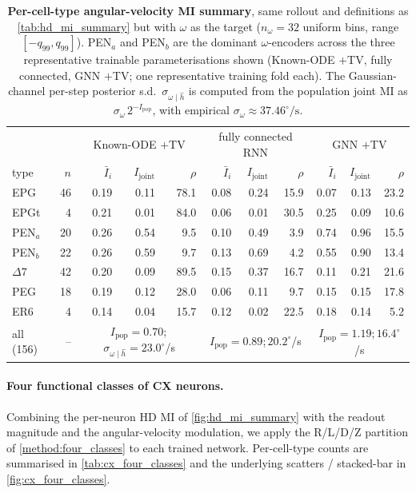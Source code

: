 \documentclass[11pt]{article}
\begin{document}
\begin{table}[H]
  \centering
  \small
  \caption{\textbf{Per-cell-type angular-velocity MI summary},
  same rollout and definitions as \cref{tab:hd_mi_summary} but with
  $\omega$ as the target ($n_\omega = 32$ uniform bins, range
  $[-q_{99},q_{99}]$). PEN$_a$ and PEN$_b$ are the dominant
  $\omega$-encoders across the three representative trainable
  parameterisations shown (Known-ODE $+$TV, fully connected, GNN
  $+$TV; one representative training fold each). The Gaussian-channel
  per-step posterior s.d.\ $\sigma_{\omega\mid\hat h}$ is computed
  from the population joint MI as
  $\sigma_\omega\,2^{-I_{\mathrm{pop}}}$, with empirical
  $\sigma_\omega \approx 37.46^\circ/\mathrm{s}$.}
  \label{tab:omega_mi_summary}
  \begin{tabular}{l|r|rrr|rrr|rrr}
    \toprule
    & & \multicolumn{3}{c|}{Known-ODE $+$TV}
      & \multicolumn{3}{c|}{fully connected RNN}
      & \multicolumn{3}{c}{GNN $+$TV} \\
    type & $n$
      & $\bar I_i$ & $I_{\mathrm{joint}}$ & $\rho$
      & $\bar I_i$ & $I_{\mathrm{joint}}$ & $\rho$
      & $\bar I_i$ & $I_{\mathrm{joint}}$ & $\rho$ \\
    \midrule
    EPG    & 46 & 0.19 & 0.11 & 78.1 & 0.08 & 0.24 & 15.9 & 0.07 & 0.13 & 23.2 \\
    EPGt   &  4 & 0.21 & 0.01 & 84.0 & 0.06 & 0.01 & 30.5 & 0.25 & 0.09 & 10.6 \\
    PEN$_a$ & 20 & 0.26 & 0.54 &  9.5 & 0.10 & 0.49 &  3.9 & 0.74 & 0.96 & 15.5 \\
    PEN$_b$ & 22 & 0.26 & 0.59 &  9.7 & 0.13 & 0.69 &  4.2 & 0.55 & 0.90 & 13.4 \\
    $\Delta 7$ & 42 & 0.20 & 0.09 & 89.5 & 0.15 & 0.37 & 16.7 & 0.11 & 0.21 & 21.6 \\
    PEG    & 18 & 0.19 & 0.12 & 28.0 & 0.06 & 0.11 &  9.7 & 0.15 & 0.15 & 17.8 \\
    ER6    &  4 & 0.14 & 0.04 & 15.7 & 0.12 & 0.02 & 22.5 & 0.18 & 0.14 &  5.2 \\
    \midrule
    all (156) & --
      & \multicolumn{3}{c|}{$I_{\mathrm{pop}} = 0.70$;\,$\sigma_{\omega\mid\hat h} = 23.0^\circ$/s}
      & \multicolumn{3}{c|}{$I_{\mathrm{pop}} = 0.89$;\,$20.2^\circ$/s}
      & \multicolumn{3}{c}{$I_{\mathrm{pop}} = 1.19$;\,$16.4^\circ$/s} \\
    \bottomrule
  \end{tabular}
\end{table}

\paragraph{Four functional classes of CX neurons.}
\label{para:four_classes}
Combining the per-neuron HD MI of \cref{fig:hd_mi_summary} with
the readout magnitude and the angular-velocity modulation, we apply
the R/L/D/Z partition of \cref{method:four_classes} to each
trained network. Per-cell-type counts are summarised in
\cref{tab:cx_four_classes} and the underlying scatters /
stacked-bar in \cref{fig:cx_four_classes}.
\end{document}

